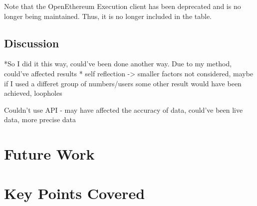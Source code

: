 Note that the OpenEthereum Execution client has been deprecated and is no longer being maintained. Thus, it is no longer included in the table.

\subsection{Discussion}
*So I did it this way, could've been done another way. Due to my method, could've affected results
* self reflection -> smaller factors not considered, maybe if I used a differet group of numbers/users some other result would have been achieved, loopholes


Couldn't use API - may have affected the accuracy of data, could've been live data, more precise data




\section{Future Work}
\section{Key Points Covered}
